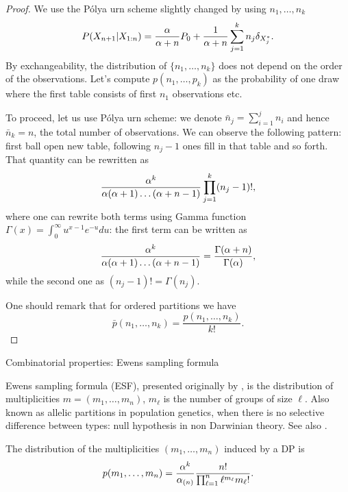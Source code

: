 \begin{proof}
	We use the P\'olya urn scheme slightly changed by using $n_1,\ldots, n_k$
\begin{equation*}
    P(X_{n+1}|X_{1:n})=\frac{\alpha}{\alpha + n}P_0 + \frac{1}{\alpha + n}\sum_{j=1}^kn_j\delta_{X^*_j}.
\end{equation*}
    By exchangeability, the distribution of $\{n_1,\ldots, n_k\}$ does not depend on the order of the observations. Let's compute $p(n_1,\ldots, p_k)$ as the probability of one draw where the first table consists of first $n_1$ observations etc. 
    
    To proceed, let us use P\'olya urn scheme: we denote $\bar{n}_j=\sum_{i=1}^jn_i$ and hence $\bar{n}_k=n$, the total number of observations. We can observe the following pattern: first ball open new table, following $n_j-1$ ones fill in that table and so forth. That quantity can be rewritten as 
    $$
    \frac{\alpha^k}{\alpha(\alpha+1)\ldots(\alpha+n-1)}\prod_{j=1}^k(n_j-1)!,
    $$
where one can rewrite both terms using Gamma function $\Gamma(x)=\int_0^\infty u^{x-1}e^{-u}du$: the first  term  can be written as 
$$
\frac{\alpha^k}{\alpha(\alpha+1)\ldots(\alpha+n-1)}=\frac{\Gamma(\alpha+n)}{\Gamma(\alpha)},
$$
while the second one as
$(n_j-1)!=\Gamma(n_j)$.

One should remark that for ordered partitions we have 
$$
\bar{p}(n_1,\ldots,n_k)=\frac{p(n_1,\ldots,n_k)}{k!}.
$$
\end{proof}



%
%
%
%



{Combinatorial properties: Ewens sampling formula}

Ewens sampling formula (ESF), presented originally by \citet{ewens1972sampling}, is the distribution of multiplicities $m=(m_1,\ldots, m_n)$, $m_\ell$ is the number of groups of size $\ell$.
Also known as allelic partitions in population genetics, when there is no selective difference between types: null hypothesis in non Darwinian theory.
See also \citet{antoniak1974mixtures}.

\begin{proposition}\label{ESF}
The distribution of the multiplicities $(m_1,\ldots, m_n)$ induced by a DP is
\begin{equation*}
    p(m_1,\ldots, m_n)=\frac{\alpha^k}{\alpha_{(n)}}\frac{n!}{\prod_{\ell=1}^n \ell^{m_\ell}m_\ell!}.
\end{equation*}
\end{proposition}\bigskip

